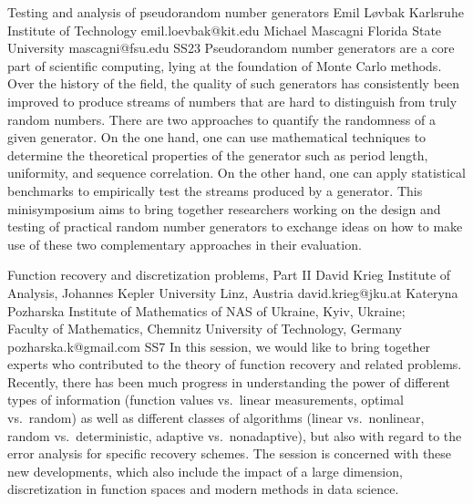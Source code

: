 \documentclass[12pt,a4paper,figuresright]{book}
\begin{document}
\begin{session}
 {Testing and analysis of pseudorandom number generators}%
 {Emil Løvbak}%
 {Karlsruhe Institute of Technology}%
 {emil.loevbak@kit.edu}%
 {Michael Mascagni}%
 {Florida State University}%
 {mascagni@fsu.edu}%
 {SS23}%
 {}%
 Pseudorandom number generators are a core part of scientific computing, lying at the foundation of Monte Carlo methods. Over the history of the field, the quality of such generators has consistently been improved to produce streams of numbers that are hard to distinguish from truly random numbers. There are two approaches to quantify the randomness of a given generator. On the one hand, one can use mathematical techniques to determine the theoretical properties of the generator such as period length, uniformity, and sequence correlation. On the other hand, one can apply statistical benchmarks to empirically test the streams produced by a generator. This minisymposium aims to bring together researchers working on the design and testing of practical random number generators to exchange ideas on how to make use of these two complementary approaches in their evaluation.
\end{session}




\clearpage

\begin{session}
 {Function recovery and discretization problems, Part II}%
 {David Krieg}%
 {Institute of Analysis, Johannes Kepler University Linz, Austria}%
 {david.krieg@jku.at}%
 {Kateryna Pozharska}%
 {Institute of Mathematics of NAS of Ukraine, Kyiv, Ukraine; \\ Faculty of Mathematics, Chemnitz University of Technology,
Germany}%
 {pozharska.k@gmail.com}%
 {SS7}%
 {}%
In this session, we would like to bring together experts who contributed to the theory of function recovery and related problems.
Recently, there has been much progress in understanding the power of different types of information (function values vs.\ linear measurements, optimal vs.\ random)
as well as different classes of algorithms (linear vs.\ nonlinear, random vs.\ deterministic, adaptive vs.\ nonadaptive), but also with regard to the error analysis for specific recovery schemes.
The session is concerned with these new developments, which also include the impact of a large dimension, discretization in function spaces and modern methods in data science.
\end{session}
\end{document}
